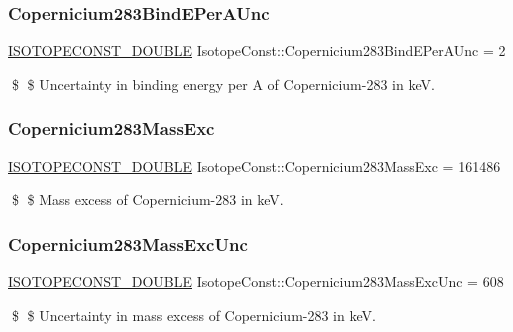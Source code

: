 \subsubsection{\texorpdfstring{Copernicium283\+Bind\+E\+Per\+A\+Unc}{Copernicium283BindEPerAUnc}}
{\footnotesize\ttfamily \mbox{\hyperlink{group___isotope_const-_macros_ga8f45a7272ce02c0b4c65c44636ed719a}{I\+S\+O\+T\+O\+P\+E\+C\+O\+N\+S\+T\+\_\+\+D\+O\+U\+B\+LE}} Isotope\+Const\+::\+Copernicium283\+Bind\+E\+Per\+A\+Unc = 2}

\$ \$ Uncertainty in binding energy per A of Copernicium-\/283 in keV. \mbox{\label{group___isotope_const-_copernicium-_cn283_gaa9781df5312060c5c72f2e3a3c1839e8}} 
\subsubsection{\texorpdfstring{Copernicium283\+Mass\+Exc}{Copernicium283MassExc}}
{\footnotesize\ttfamily \mbox{\hyperlink{group___isotope_const-_macros_ga8f45a7272ce02c0b4c65c44636ed719a}{I\+S\+O\+T\+O\+P\+E\+C\+O\+N\+S\+T\+\_\+\+D\+O\+U\+B\+LE}} Isotope\+Const\+::\+Copernicium283\+Mass\+Exc = 161486}

\$ \$ Mass excess of Copernicium-\/283 in keV. \mbox{\label{group___isotope_const-_copernicium-_cn283_ga448b5c3b4922b4e1bca4ab7ba020a252}} 
\subsubsection{\texorpdfstring{Copernicium283\+Mass\+Exc\+Unc}{Copernicium283MassExcUnc}}
{\footnotesize\ttfamily \mbox{\hyperlink{group___isotope_const-_macros_ga8f45a7272ce02c0b4c65c44636ed719a}{I\+S\+O\+T\+O\+P\+E\+C\+O\+N\+S\+T\+\_\+\+D\+O\+U\+B\+LE}} Isotope\+Const\+::\+Copernicium283\+Mass\+Exc\+Unc = 608}

\$ \$ Uncertainty in mass excess of Copernicium-\/283 in keV. \mbox{\label{group___isotope_const-_copernicium-_cn283_gac2b1a115e5390e6770220cb2483953ac}} 
